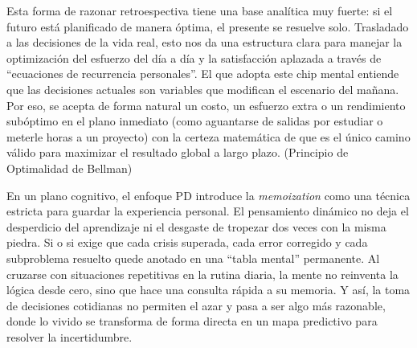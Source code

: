 Esta forma de razonar retroespectiva tiene una base analítica muy fuerte: si el futuro está planificado de manera óptima, el presente se resuelve solo. Trasladado a las decisiones de la vida real, esto nos da una estructura clara para manejar la optimización del esfuerzo del día a día y la satisfacción aplazada a través de ``ecuaciones de recurrencia personales''. El que adopta este chip mental entiende que las decisiones actuales son variables que modifican el escenario del mañana. Por eso, se acepta de forma natural un costo, un esfuerzo extra o un rendimiento subóptimo en el plano inmediato (como aguantarse de salidas por estudiar o meterle horas a un proyecto) con la certeza matemática de que es el único camino válido para maximizar el resultado global a largo plazo. (Principio de Optimalidad de Bellman)

En un plano cognitivo, el enfoque PD introduce la \textit{memoization} como una técnica estricta para guardar la experiencia personal. El pensamiento dinámico no deja el desperdicio del aprendizaje ni el desgaste de tropezar dos veces con la misma piedra. Si o si exige que cada crisis superada, cada error corregido y cada subproblema resuelto quede anotado en una ``tabla mental'' permanente. Al cruzarse con situaciones repetitivas en la rutina diaria, la mente no reinventa la lógica desde cero, sino que hace una consulta rápida a su memoria. Y así, la toma de decisiones cotidianas no permiten el azar y pasa a ser algo más razonable, donde lo vivido se transforma de forma directa en un mapa predictivo para resolver la incertidumbre.
